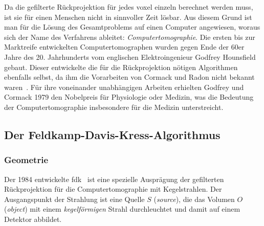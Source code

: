 Da die gefilterte Rückprojektion für jedes \gls{voxel} einzeln berechnet werden muss, ist sie für einen Menschen nicht
in sinnvoller Zeit lösbar. Aus diesem Grund ist man für die Lösung des Gesamtproblems auf einen Computer angewiesen,
woraus sich der Name des Verfahrens ableitet: \textit{Computertomographie}. Die ersten bis zur Marktreife entwickelten
Computertomographen wurden gegen Ende der 60er Jahre des 20. Jahrhunderts vom englischen Elektroingenieur Godfrey
Hounsfield gebaut. Dieser entwickelte die für die Rückprojektion nötigen Algorithmen ebenfalls selbst, da ihm die
Vorarbeiten von Cormack und Radon nicht bekannt waren~\cite{kalender}. Für ihre voneinander unabhängigen Arbeiten
erhielten Godfrey und Cormack 1979 den Nobelpreis für Physiologie oder Medizin, was die Bedeutung der
Computertomographie insbesondere für die Medizin unterstreicht.

\subsection{Der Feldkamp-Davis-Kress-Algorithmus}

\subsubsection{Geometrie}

Der 1984 entwickelte \gls{fdk}~\cite{fdk} ist eine spezielle Ausprägung der gefilterten Rückprojektion für die
Computertomographie mit Kegelstrahlen. Der Ausgangspunkt der Strahlung ist eine Quelle $S$ (\textit{source}), die das
Volumen $O$ (\textit{object}) mit einem \textit{kegelförmigen} Strahl durchleuchtet und damit auf einem Detektor
abbildet.

